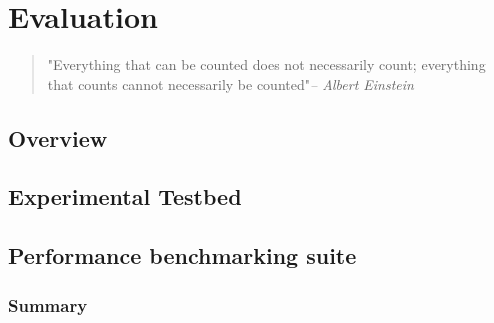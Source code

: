 \chapter{Evaluation}
\label{ch:evaluation}

\begin{quotation}
  {\small\it }"Everything that can be counted does not necessarily count; everything that counts cannot necessarily be counted"{\small\it -- Albert Einstein }
\end{quotation}

\section{Overview}

\section{Experimental Testbed}

\section{Performance benchmarking suite}

\subsection*{Summary}
